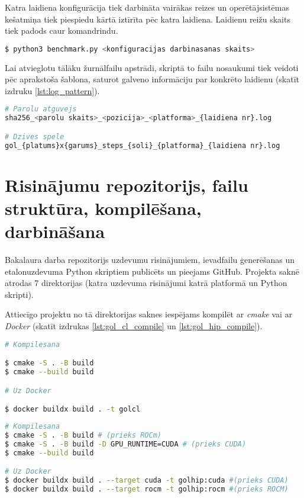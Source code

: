 Katra laidiena konfigurācija tiek darbināta vairākas reizes un operētājsistēmas
kešatmiņa tiek piespiedu kārtā iztīrīta pēc katra laidiena. Laidienu reižu
skaits tiek padods caur komandrindu.

\begin{lstlisting}[caption={Etalonuzdevumu darbināšanas Python skripta darbināšana},
    label=lst:bench_cli, language=bash]
$ python3 benchmark.py <konfiguracijas darbinasanas skaits>
\end{lstlisting}

Lai atvieglotu tālāku žurnālfailu apstrādi, skriptā to failu nosaukumi tiek
veidoti pēc aprakstoša šablona, saturot galveno informāciju par konkrēto
laidienu (skatīt izdruku \ref{lst:log_pattern}).
\begin{lstlisting}[caption={Žurnālfailu nosaukumu šabloni},
    label=lst:log_pattern, language=bash]
# Parolu atguvejs
sha256_<parolu skaits>_<pozicija>_<platforma>_{laidiena nr}.log

# Dzives spele
gol_{platums}x{garums}_steps_{soli}_{platforma}_{laidiena nr}.log
\end{lstlisting}




\section{Risinājumu repozitorijs, failu struktūra, kompilēšana, darbināšana}
Bakalaura darba repozitorijs uzdevumu risinājumiem,
ievadfailu ģenerēšanas un etalonuzdevuma Python skriptiem publicēts un pieejams
GitHub.\cite{bak_github_repo} Projekta saknē atrodas 7 direktorijas (katra uzdevuma
risinājumi katrā platformā un Python skripti).

Attiecīgo projektu no tā direktorijas saknes iespējams kompilēt ar \textit{cmake}
vai ar \textit{Docker} (skatīt izdrukas \ref{lst:gol_cl_compile} un \ref{lst:gol_hip_compile}).

\begin{lstlisting}[caption={OpenCL un CUDA risinājumu kompilēšana},
    label=lst:gol_cl_compile, language=bash]
# Kompilesana

$ cmake -S . -B build
$ cmake --build build

# Uz Docker

$ docker buildx build . -t golcl
\end{lstlisting}

\begin{lstlisting}[caption={ROCm HIP risinājumu kompilēšana}, label=lst:gol_hip_compile, language=bash]
# Kompilesana 
$ cmake -S . -B build # (prieks ROCm)
$ cmake -S . -B build -D GPU_RUNTIME=CUDA # (prieks CUDA)
$ cmake --build build

# Uz Docker
$ docker buildx build . --target cuda -t golhip:cuda #(prieks CUDA)
$ docker buildx build . --target rocm -t golhip:rocm #(prieks ROCM)
\end{lstlisting}


